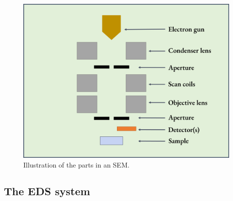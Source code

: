 \begin{figure}[ht]
    \centering
    \includegraphics[width=0.8\linewidth]{figures/SEM_setup.png}
    \caption{
        Illustration of the parts in an SEM.
    }
    \label{fig:SEM_setup}
\end{figure}








\subsection{The EDS system}

